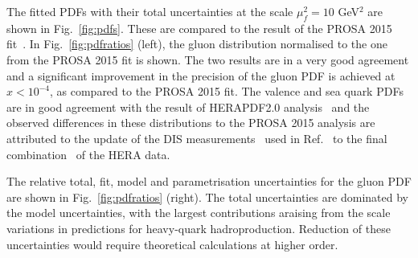\documentclass[12pt]{article}
\begin{document}
The fitted PDFs with their total uncertainties at the scale $\mu^2_f=10$ GeV$^2$ are shown in Fig.~\ref{fig:pdfs}. These are compared to the result of the PROSA 2015 fit~\cite{Zenaiev:2015rfa}. In Fig.~\ref{fig:pdfratios} (left), the gluon distribution 
normalised to the one from the PROSA 2015 fit is shown. The two results are in a very good agreement and a significant improvement 
in the precision of the gluon PDF is achieved at $x < 10^{-4}$, as compared to the PROSA 2015 fit. 
The valence and sea quark PDFs are in good agreement with the result of HERAPDF2.0 analysis~\cite{Abramowicz:2015mha} and the 
observed differences in these distributions to the PROSA 2015 analysis are attributed to the update of the DIS measurements~\cite{Aaron:2009aa} used in Ref.~\cite{Zenaiev:2015rfa} to the final combination~\cite{Abramowicz:2015mha} of the HERA data.

The relative total, fit, model and parametrisation uncertainties for the gluon PDF are shown in Fig.~\ref{fig:pdfratios} (right). 
The total uncertainties are dominated by the model uncertainties, with the largest contributions araising from the scale 
variations in predictions for heavy-quark hadroproduction. Reduction of these uncertainties would require theoretical calculations at higher order.
\end{document}
